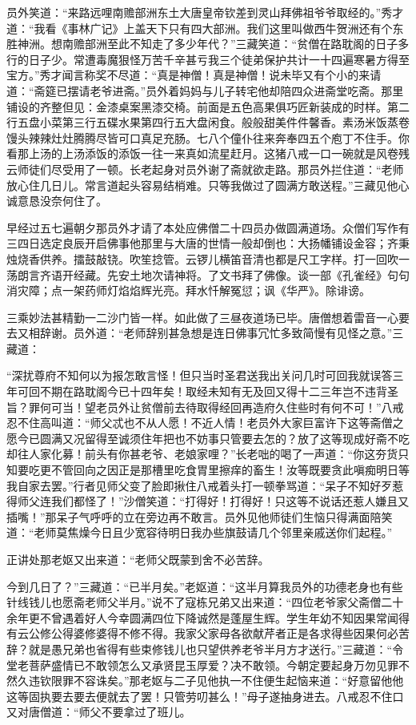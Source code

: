 \documentclass[12pt,UTF8]{ctexbook}
\begin{document}
{	员外笑道：“来路远哩南赡部洲东土大唐皇帝钦差到灵山拜佛祖爷爷取经的。”秀才道：“我看《事林广记》上盖天下只有四大部洲。我们这里叫做西牛贺洲还有个东胜神洲。想南赡部洲至此不知走了多少年代？”三藏笑道：“贫僧在路耽阁的日子多行的日子少。常遭毒魔狠怪万苦千辛甚亏我三个徒弟保护共计一十四遍寒暑方得至宝方。”秀才闻言称奖不尽道：“真是神僧！真是神僧！说未毕又有个小的来请道：“斋筵已摆请老爷进斋。”员外着妈妈与儿子转宅他却陪四众进斋堂吃斋。那里铺设的齐整但见：金漆桌案黑漆交椅。前面是五色高果俱巧匠新装成的时样。第二行五盘小菜第三行五碟水果第四行五大盘闲食。般般甜美件件馨香。素汤米饭蒸卷馒头辣辣灶灶腾腾尽皆可口真足充肠。七八个僮仆往来奔奉四五个庖丁不住手。你看那上汤的上汤添饭的添饭一往一来真如流星赶月。这猪八戒一口一碗就是风卷残云师徒们尽受用了一顿。长老起身对员外谢了斋就欲走路。那员外拦住道：“老师放心住几日儿。常言道起头容易结梢难。只等我做过了圆满方敢送程。”三藏见他心诚意恳没奈何住了。
	
	早经过五七遍朝夕那员外才请了本处应佛僧二十四员办做圆满道场。众僧们写作有三四日选定良辰开启佛事他那里与大唐的世情一般却倒也：大扬幡铺设金容；齐秉烛烧香供养。擂鼓敲铙。吹笙捻管。云锣儿横笛音清也都是尺工字样。打一回吹一荡朗言齐语开经藏。先安土地次请神将。了文书拜了佛像。谈一部《孔雀经》句句消灾障；点一架药师灯焰焰辉光亮。拜水忏解冤愆；讽《华严》。除诽谤。
	
	三乘妙法甚精勤一二沙门皆一样。如此做了三昼夜道场已毕。唐僧想着雷音一心要去又相辞谢。员外道：“老师辞别甚急想是连日佛事冗忙多致简慢有见怪之意。”三藏道：
	
	“深扰尊府不知何以为报怎敢言怪！但只当时圣君送我出关问几时可回我就误答三年可回不期在路耽阁今已十四年矣！取经未知有无及回又得十二三年岂不违背圣旨？罪何可当！望老员外让贫僧前去待取得经回再造府久住些时有何不可！”八戒忍不住高叫道：“师父忒也不从人愿！不近人情！老员外大家巨富许下这等斋僧之愿今已圆满又况留得至诚须住年把也不妨事只管要去怎的？放了这等现成好斋不吃却往人家化募！前头有你甚老爷、老娘家哩？”长老咄的喝了一声道：“你这夯货只知要吃更不管回向之因正是那槽里吃食胃里擦痒的畜生！汝等既要贪此嗔痴明日等我自家去罢。”行者见师父变了脸即揪住八戒着头打一顿拳骂道：“呆子不知好歹惹得师父连我们都怪了！”沙僧笑道：“打得好！打得好！只这等不说话还惹人嫌且又插嘴！”那呆子气呼呼的立在旁边再不敢言。员外见他师徒们生恼只得满面陪笑道：“老师莫焦燥今日且少宽容待明日我办些旗鼓请几个邻里亲戚送你们起程。”
	
	正讲处那老妪又出来道：“老师父既蒙到舍不必苦辞。
	
	今到几日了？”三藏道：“已半月矣。”老妪道：“这半月算我员外的功德老身也有些针线钱儿也愿斋老师父半月。”说不了寇栋兄弟又出来道：“四位老爷家父斋僧二十余年更不曾遇着好人今幸圆满四位下降诚然是蓬屋生辉。学生年幼不知因果常闻得有云公修公得婆修婆得不修不得。我家父家母各欲献芹者正是各求得些因果何必苦辞？就是愚兄弟也省得有些束修钱儿也只望供养老爷半月方才送行。”三藏道：“令堂老菩萨盛情已不敢领怎么又承贤昆玉厚爱？决不敢领。今朝定要起身万勿见罪不然久违钦限罪不容诛矣。”那老妪与二子见他执一不住便生起恼来道：“好意留他他这等固执要去要去便就去了罢！只管劳叨甚么！”母子遂抽身进去。八戒忍不住口又对唐僧道：“师父不要拿过了班儿。
	
}
\end{document}
